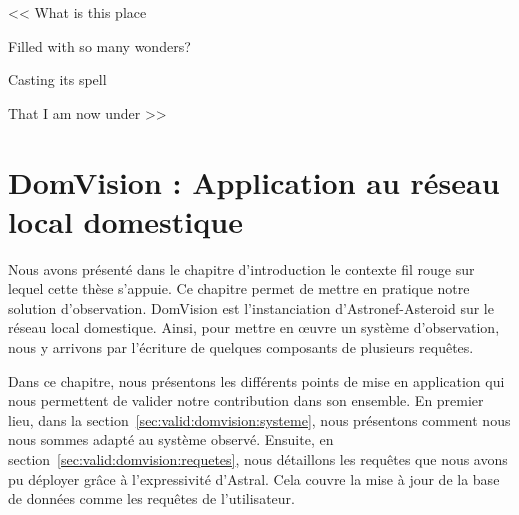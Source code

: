 \begin{savequote}[6cm]
<< What is this place

Filled with so many wonders?

Casting its spell

That I am now under >>

\end{savequote}

\chapter{DomVision : Application au réseau local domestique}\label{chap:valid:domvision}
\chaptertoc
Nous avons présenté dans le chapitre d'introduction le contexte fil rouge sur lequel cette thèse s'appuie. Ce chapitre permet de mettre en pratique notre solution d'observation. DomVision est l'instanciation d'Astronef-Asteroid sur le réseau local domestique. Ainsi, pour mettre en œuvre un système d'observation, nous y arrivons par l'écriture de quelques composants de plusieurs requêtes.

Dans ce chapitre, nous présentons les différents points de mise en application qui nous permettent de valider notre contribution dans son ensemble. En premier lieu, dans la section~\ref{sec:valid:domvision:systeme}, nous présentons comment nous nous sommes adapté au système observé. Ensuite, en section~\ref{sec:valid:domvision:requetes}, nous détaillons les requêtes que nous avons pu déployer grâce à l'expressivité d'Astral. Cela couvre la mise à jour de la base de données comme les requêtes de l'utilisateur.




